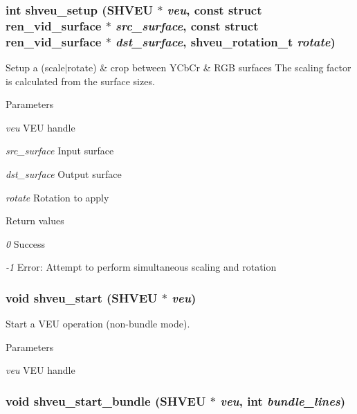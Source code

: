 \subsubsection[{shveu\_\-setup}]{\setlength{\rightskip}{0pt plus 5cm}int shveu\_\-setup (SHVEU $\ast$ {\em veu}, \/  const struct {\bf ren\_\-vid\_\-surface} $\ast$ {\em src\_\-surface}, \/  const struct {\bf ren\_\-vid\_\-surface} $\ast$ {\em dst\_\-surface}, \/  {\bf shveu\_\-rotation\_\-t} {\em rotate})}\label{veu__colorspace_8h_a7ac46541008aebed8ecc34d02f96e9f2}


Setup a (scale$|$rotate) \& crop between YCbCr \& RGB surfaces The scaling factor is calculated from the surface sizes. 


\begin{DoxyParams}{Parameters}
\item[{\em veu}]VEU handle \item[{\em src\_\-surface}]Input surface \item[{\em dst\_\-surface}]Output surface \item[{\em rotate}]Rotation to apply \end{DoxyParams}

\begin{DoxyRetVals}{Return values}
\item[{\em 0}]Success \item[{\em -\/1}]Error: Attempt to perform simultaneous scaling and rotation \end{DoxyRetVals}
\subsubsection[{shveu\_\-start}]{\setlength{\rightskip}{0pt plus 5cm}void shveu\_\-start (SHVEU $\ast$ {\em veu})}\label{veu__colorspace_8h_a1bf8f3da86f3884735266cbadaadafe1}


Start a VEU operation (non-\/bundle mode). 


\begin{DoxyParams}{Parameters}
\item[{\em veu}]VEU handle \end{DoxyParams}
\subsubsection[{shveu\_\-start\_\-bundle}]{\setlength{\rightskip}{0pt plus 5cm}void shveu\_\-start\_\-bundle (SHVEU $\ast$ {\em veu}, \/  int {\em bundle\_\-lines})}\label{veu__colorspace_8h_ab8a81e4c1771beedeb4276bf05d61df2}


